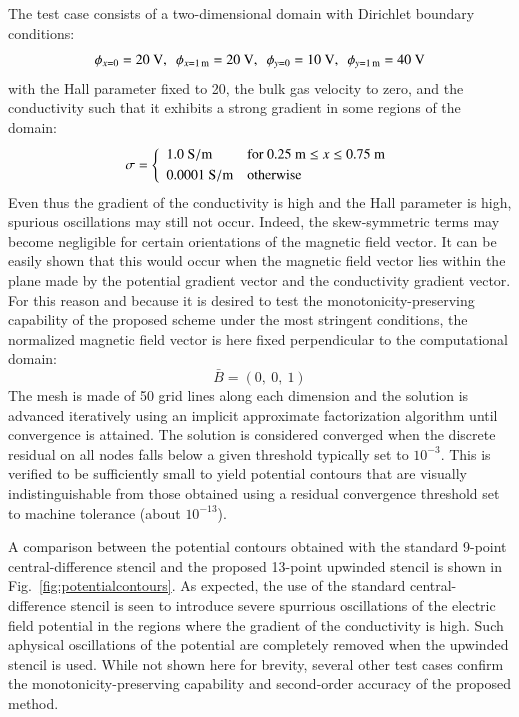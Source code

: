 \documentclass[twoside,9pt,twocolumn]{aiaa}
\newcommand{\alb}{\vspace{0.1cm}\\} %
\begin{document}
The  test case consists of a two-dimensional domain with Dirichlet boundary conditions:
%
\begin{equation}
 \phi_{x=0}=20~{\rm V},~~\phi_{x=1\,{\rm m}}=20~{\rm V}
,~~\phi_{y=0}=10~{\rm V},~~\phi_{y=1\,{\rm m}}=40~{\rm V}
\end{equation}
% 
with the Hall parameter  fixed to 20, the bulk gas velocity to zero, and the conductivity such that it exhibits a strong gradient in some regions of the domain: 
%
\begin{equation}
\sigma=
\left\{
\begin{array}{ll}
 1.0~{\rm S/m}&{\rm for~}0.25~{\rm m} \le x \le 0.75~{\rm m}\alb
 0.0001~{\rm S/m}&{\rm otherwise}
\end{array}
\right.
\end{equation}
% 
Even thus the gradient of the conductivity is high and  the Hall parameter is high, spurious oscillations may still not occur. Indeed, the skew-symmetric terms may  become  negligible for certain orientations of the magnetic field vector. It can be easily shown that this would occur when the magnetic field vector lies within the plane made by the potential gradient vector and the conductivity gradient vector. For this reason and because it is desired to test the monotonicity-preserving capability of the proposed scheme under the most stringent conditions, the normalized magnetic field vector is here fixed perpendicular to the computational domain:
%
\begin{equation}
\bar{B}=(0,~0,~1)
\end{equation}
%
The mesh is made of 50 grid lines along each dimension and the solution is advanced iteratively using an implicit approximate factorization algorithm until convergence is attained. The solution is considered converged when the discrete residual on all nodes falls below a given threshold typically set to $10^{-3}$. This is verified to be sufficiently small to yield potential contours that are visually indistinguishable from those obtained using a residual convergence threshold set to machine tolerance (about $10^{-13}$).


A comparison between the potential contours obtained with the standard 9-point central-difference stencil and the proposed 13-point upwinded stencil is shown in Fig.\ \ref{fig:potentialcontours}. As expected, the use of the standard central-difference stencil is seen to introduce severe spurrious oscillations of the electric field potential in the regions where the gradient of the conductivity is high. Such aphysical oscillations of the potential are completely removed when the upwinded stencil is used.
 While not shown here for brevity, several other test cases confirm the monotonicity-preserving capability and second-order accuracy of the proposed method.   
\end{document}
